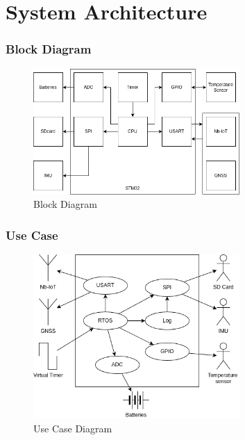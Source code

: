 \section{System Architecture}


\subsubsection{Block Diagram}

\begin{figure}[H]
    \centering
    \includegraphics[width=0.7\textwidth]{images/diagrams/block_diagram/block_diagram_1/block_diagram.drawio.png}  %
    \caption{Block Diagram}
    \label{fig:Block Diagram}        
\end{figure}

\subsubsection{Use Case}

\begin{figure}[H]
    \centering
    \includegraphics[width=0.7\textwidth]{images/diagrams/use_case/Use Case.drawio.png}  %
    \caption{Use Case Diagram}
    \label{fig:Use Case Diagram}        
\end{figure}

